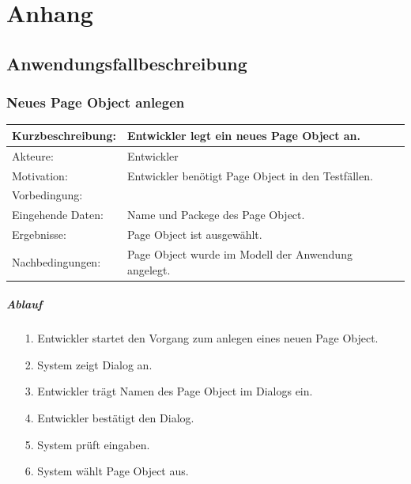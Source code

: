 \appendix
\chapter{Anhang}
\section{Anwendungsfallbeschreibung}
\label{anhang:anwendungsfallbeschreibung}
\subsection{Neues Page Object anlegen}
\label{sec:neues_page_object_anlegen}

\begin{tabular}[h]{|p{4cm}|p{}|}
\hline 
\rule[-1ex]{0pt}{2.5ex}Kurzbeschreibung: & 
Entwickler legt ein neues Page Object an. \\  
\hline 
\rule[-1ex]{0pt}{2.5ex}Akteure: & 
Entwickler \\ 
\hline 
\rule[-1ex]{0pt}{2.5ex}Motivation: & 
Entwickler benötigt Page Object in den Testfällen. \\ 
\hline 
\rule[-1ex]{0pt}{2.5ex}Vorbedingung: &  \\ 
\hline 
\rule[-1ex]{0pt}{2.5ex}Eingehende Daten: & Name und Packege des Page Object. \\ 
\hline 
\rule[-1ex]{0pt}{2.5ex}Ergebnisse: & Page Object ist ausgewählt. \\ 
\hline 
\rule[-1ex]{0pt}{2.5ex}Nachbedingungen: & Page Object wurde im Modell der Anwendung angelegt.  \\ 
\hline 
\end{tabular} 

\paragraph{Ablauf}

\begin{itemize}[itemsep=0pt]
\item[1.] Entwickler startet den Vorgang zum anlegen eines neuen Page Object. 
\item[2.] System zeigt Dialog an. 
\item[3.] Entwickler trägt Namen des Page Object im Dialogs ein.
\item[4.] Entwickler bestätigt den Dialog.
\item[5.] System prüft eingaben.
\item[6.] System wählt Page Object aus.
\end{itemize}

